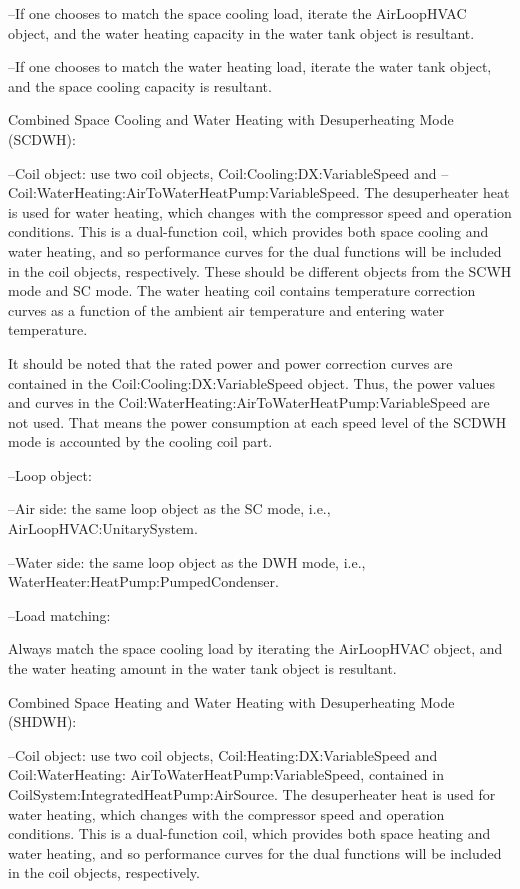 --If one chooses to match the space cooling load, iterate the AirLoopHVAC object, and the water heating capacity in the water tank object is resultant.

--If one chooses to match the water heating load, iterate the water tank object, and the space cooling capacity is resultant.

Combined Space Cooling and Water Heating with Desuperheating Mode (SCDWH):

--Coil object: use two coil objects, Coil:Cooling:DX:VariableSpeed and -- Coil:WaterHeating:AirToWaterHeatPump:VariableSpeed. The desuperheater heat is used for water heating, which changes with the compressor speed and operation conditions. This is a dual-function coil, which provides both space cooling and water heating, and so performance curves for the dual functions will be included in the coil objects, respectively. These should be different objects from the SCWH mode and SC mode. The water heating coil contains temperature correction curves as a function of the ambient air temperature and entering water temperature.

It should be noted that the rated power and power correction curves are contained in the Coil:Cooling:DX:VariableSpeed object. Thus, the power values and curves in the Coil:WaterHeating:AirToWaterHeatPump:VariableSpeed are not used. That means the power consumption at each speed level of the SCDWH mode is accounted by the cooling coil part.

--Loop object:

--Air side: the same loop object as the SC mode, i.e., AirLoopHVAC:UnitarySystem.

--Water side:  the same loop object as the DWH mode, i.e., WaterHeater:HeatPump:PumpedCondenser.

--Load matching:

Always match the space cooling load by iterating the AirLoopHVAC object, and the water heating amount in the water tank object is resultant.

Combined Space Heating and Water Heating with Desuperheating Mode (SHDWH):

--Coil object: use two coil objects, Coil:Heating:DX:VariableSpeed and Coil:WaterHeating: AirToWaterHeatPump:VariableSpeed, contained in CoilSystem:IntegratedHeatPump:AirSource. The desuperheater heat is used for water heating, which changes with the compressor speed and operation conditions. This is a dual-function coil, which provides both space heating and water heating, and so performance curves for the dual functions will be included in the coil objects, respectively.

